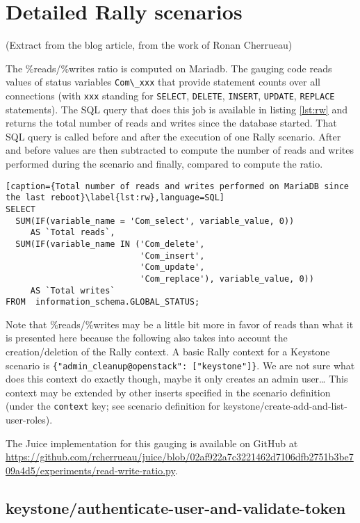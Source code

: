 

\section{Detailed Rally scenarios}
\label{sec:detail-rally}

(Extract from the blog article, from the work of Ronan Cherrueau)

The \%reads/\%writes ratio is computed on Mariadb. The gauging code reads values of status variables \verb+Com\_xxx+ that provide statement counts over all connections (with \verb+xxx+ standing for \verb+SELECT+, \verb+DELETE+, \verb+INSERT+, \verb+UPDATE+, \verb+REPLACE+ statements). The SQL query that does this job is available in listing \ref{lst:rw} and returns the total number of reads and writes since the database started. That SQL query is called before and after the execution of one Rally scenario. After and before values are then subtracted to compute the number of reads and writes performed during the scenario and finally, compared to compute the ratio.

\begin{lstlisting}[caption={Total number of reads and writes performed on MariaDB since the last reboot}\label{lst:rw},language=SQL]
SELECT
  SUM(IF(variable_name = 'Com_select', variable_value, 0))
     AS `Total reads`,
  SUM(IF(variable_name IN ('Com_delete',
                           'Com_insert',
                           'Com_update',
                           'Com_replace'), variable_value, 0))
     AS `Total writes`
FROM  information_schema.GLOBAL_STATUS;
\end{lstlisting}

Note that \%reads/\%writes may be a little bit more in favor of reads than what it is presented here because the following also takes into account the creation/deletion of the Rally context. A basic Rally context for a Keystone scenario is \verb+{"admin_cleanup@openstack": ["keystone"]}+. We are not sure what does this context do exactly though, maybe it only creates an admin user… This context may be extended by other inserts specified in the scenario definition (under the \verb+context+ key; see scenario definition for keystone/create-add-and-list-user-roles).

The Juice implementation for this gauging is available on GitHub at \url{https://github.com/rcherrueau/juice/blob/02af922a7c3221462d7106dfb2751b3be709a4d5/experiments/read-write-ratio.py}.


\subsection{keystone/authenticate-user-and-validate-token}

